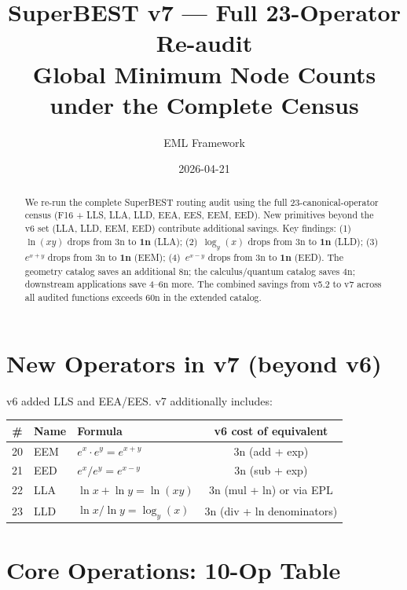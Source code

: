 \documentclass[11pt]{article}
\title{SuperBEST v7 --- Full 23-Operator Re-audit\\
{\large Global Minimum Node Counts under the Complete Census}}
\author{EML Framework}
\date{2026-04-21}
\begin{document}
\maketitle

\begin{abstract}
We re-run the complete SuperBEST routing audit using the full 23-canonical-operator
census (F16 + LLS, LLA, LLD, EEA, EES, EEM, EED). New primitives beyond the v6 set
(LLA, LLD, EEM, EED) contribute additional savings.
Key findings: (1)~$\ln(xy)$ drops from 3n to \textbf{1n} (LLA); (2)~$\log_y(x)$
drops from 3n to \textbf{1n} (LLD); (3)~$e^{x+y}$ drops from 3n to \textbf{1n} (EEM);
(4)~$e^{x-y}$ drops from 3n to \textbf{1n} (EED). The geometry catalog saves an
additional 8n; the calculus/quantum catalog saves 4n; downstream applications save
4--6n more. The combined savings from v5.2 to v7 across all audited functions
exceeds 60n in the extended catalog.
\end{abstract}

\tableofcontents
\bigskip

\section{New Operators in v7 (beyond v6)}
\label{sec:new}

v6 added LLS and EEA/EES. v7 additionally includes:

\begin{center}
\begin{tabular}{cllc}
\toprule
\# & Name & Formula & v6 cost of equivalent \\
\midrule
20 & EEM & $e^x \cdot e^y = e^{x+y}$   & 3n (add + exp) \\
21 & EED & $e^x / e^y = e^{x-y}$        & 3n (sub + exp) \\
22 & LLA & $\ln x + \ln y = \ln(xy)$    & 3n (mul + ln) or via EPL \\
23 & LLD & $\ln x / \ln y = \log_y(x)$  & 3n (div + ln denominators) \\
\bottomrule
\end{tabular}
\end{center}

\section{Core Operations: 10-Op Table}
\label{sec:core}
\end{document}
